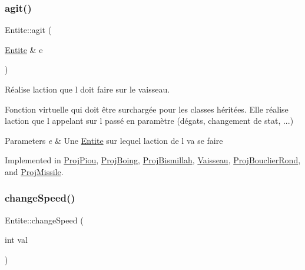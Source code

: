 \mbox{\label{class_entite_a848ec47afac1d7ba970a2bcab5dc7b3b}} 
\subsubsection{\texorpdfstring{agit()}{agit()}}
{\footnotesize\ttfamily Entite\+::agit (\begin{DoxyParamCaption}\item[{\mbox{\hyperlink{class_entite}{Entite}} \&}]{e }\end{DoxyParamCaption})\hspace{0.3cm}{\ttfamily [pure virtual]}}



Réalise l\textquotesingle{}action que l doit faire sur le vaisseau. 

Fonction virtuelle qui doit être surchargée pour les classes héritées. Elle réalise l\textquotesingle{}action que l appelant sur l passé en paramètre (dégats, changement de stat, ...) 
\begin{DoxyParams}{Parameters}
{\em e} & Une {\ttfamily \mbox{\hyperlink{class_entite}{Entite}}} sur lequel l\textquotesingle{}action de l va se faire \\
\hline
\end{DoxyParams}


Implemented in \mbox{\hyperlink{class_proj_piou_acbc0bea0b23b3daa311679bec7ffe91a}{Proj\+Piou}}, \mbox{\hyperlink{class_proj_boing_acbee1a0aa00582682ce755e1b19d687a}{Proj\+Boing}}, \mbox{\hyperlink{class_proj_bismillah_a85f9cab1718a389d1e177806cb2c32c9}{Proj\+Bismillah}}, \mbox{\hyperlink{class_vaisseau_a7950f1a06690d5f5eec5e38f3021a04c}{Vaisseau}}, \mbox{\hyperlink{class_proj_bouclier_rond_a60547ae68c6862f6e4c8b9cdd94bb52b}{Proj\+Bouclier\+Rond}}, and \mbox{\hyperlink{class_proj_missile_a8125c442857f7a0fc2d0ff442c39aca7}{Proj\+Missile}}.

\mbox{\label{class_entite_abd20483e4d51bc7ebb0eb58bb4366757}} 
\subsubsection{\texorpdfstring{change\+Speed()}{changeSpeed()}}
{\footnotesize\ttfamily Entite\+::change\+Speed (\begin{DoxyParamCaption}\item[{int}]{val }\end{DoxyParamCaption})\hspace{0.3cm}{\ttfamily [inline]}}



